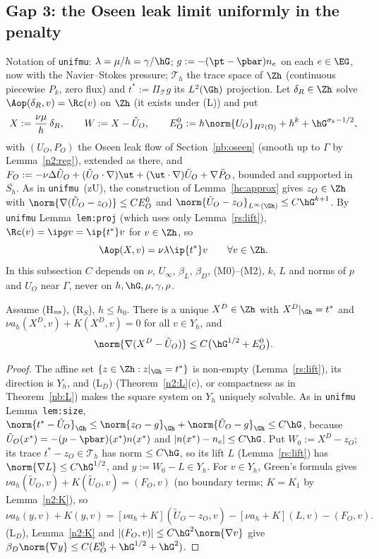 \subsection{Gap 3: the Oseen leak limit uniformly in the penalty}\label{n2:unif}

Notation of \texttt{unifmu}: $\lambda=\mu/h=\gamma/\hG$; $g:=-(\pt-\pbar)n_e$ on each $e\in\EG$, now with the Navier--Stokes pressure;
$\mathcal T_h$ the trace space of $\Zh$ (continuous piecewise $P_k$, zero flux) and $t^\ast:=\Pi_{\mathcal T}g$ its $L^2(\Gh)$ projection. Let
$\delta_R\in\Zh$ solve $\Aop(\delta_R,v)=\Rc(v)$ on $\Zh$ (it exists under (L)) and put
\[
X:=\frac{\nu\mu}h\,\delta_R,\qquad W:=X-\tilde U_O,\qquad E^0_O:=h\norm{U_O}_{H^2(\Omega)}+h^k+\hG^{\sigma_k-1/2},
\]
with $(U_O,P_O)$ the Oseen leak flow of Section~\ref{nb:oseen} (smooth up to $\Gamma$ by Lemma~\ref{n2:reg}), extended as there, and
$F_O:=-\nu\Delta\tilde U_O+(\tilde U_O\cdot\nabla)\ut+(\ut\cdot\nabla)\tilde U_O+\nabla\tilde P_O$, bounded and supported in $\overline{S_h}$. As in
\texttt{unifmu}~(zU), the construction of Lemma~\ref{hc:approx} gives $z_O\in\Zh$ with $\norm{\nabla(\tilde U_O-z_O)}\le CE^0_O$ and
$\norm{\tilde U_O-z_O}_{L^\infty(\Gh)}\le C\hG^{k+1}$. By \texttt{unifmu} Lemma~\texttt{lem:proj} (which uses only Lemma~\ref{rs:lift}),
$\Rc(v)=\ip gv=\ip{t^\ast}v$ for $v\in\Zh$, so
\[
\Aop(X,v)=\nu\lambda\ip{t^\ast}v\qquad\forall v\in\Zh .
\]
In this subsection $C$ depends on $\nu$, $U_\infty$, $\beta_L$, $\beta_D$, (M0)--(M2), $k$, $L$ and norms of $p$ and $U_O$ near $\Gamma$, never on $h,\hG,\mu,\gamma,\rho$.

\begin{lemma}\label{n2:XD}
Assume (H$_{\rm ns}$), (R$_S$), $h\le h_0$. There is a unique $X^D\in\Zh$ with $X^D|_{\Gh}=t^\ast$ and $\nu a_h(X^D,v)+K(X^D,v)=0$ for all $v\in Y_h$, and
\[
\norm{\nabla(X^D-\tilde U_O)}\le C\bigl(\hG^{1/2}+E^0_O\bigr).
\]
\end{lemma}

\begin{proof}
The affine set $\{z\in\Zh:z|_{\Gh}=t^\ast\}$ is non-empty (Lemma~\ref{rs:lift}), its direction is $Y_h$, and (L$_D$) (Theorem~\ref{n2:L}(c), or
compactness as in Theorem~\ref{nb:L}) makes the square system on $Y_h$ uniquely solvable. As in \texttt{unifmu} Lemma~\texttt{lem:size},
$\norm{t^\ast-\tilde U_O}_{\Gh}\le\norm{z_O-g}_{\Gh}+\norm{\tilde U_O-g}_{\Gh}\le C\hG$, because $\tilde U_O(x^\ast)=-(p-\pbar)(x^\ast)n(x^\ast)$ and
$|n(x^\ast)-n_e|\le C\hG$. Put $W_0:=X^D-z_O$; its trace $t^\ast-z_O\in\mathcal T_h$ has norm $\le C\hG$, so its lift $L$ (Lemma~\ref{rs:lift}) has
$\norm{\nabla L}\le C\hG^{1/2}$, and $y:=W_0-L\in Y_h$. For $v\in Y_h$, Green's formula gives $\nu a_h(\tilde U_O,v)+K(\tilde U_O,v)=(F_O,v)$ (no
boundary terms; $K=K_1$ by Lemma~\ref{n2:K}), so
\[
\nu a_h(y,v)+K(y,v)=[\nu a_h+K](\tilde U_O-z_O,v)-[\nu a_h+K](L,v)-(F_O,v).
\]
(L$_D$), Lemma~\ref{n2:K} and $|(F_O,v)|\le C\hG^2\norm{\nabla v}$ give $\beta_D\norm{\nabla y}\le C(E^0_O+\hG^{1/2}+\hG^2)$.
\end{proof}

